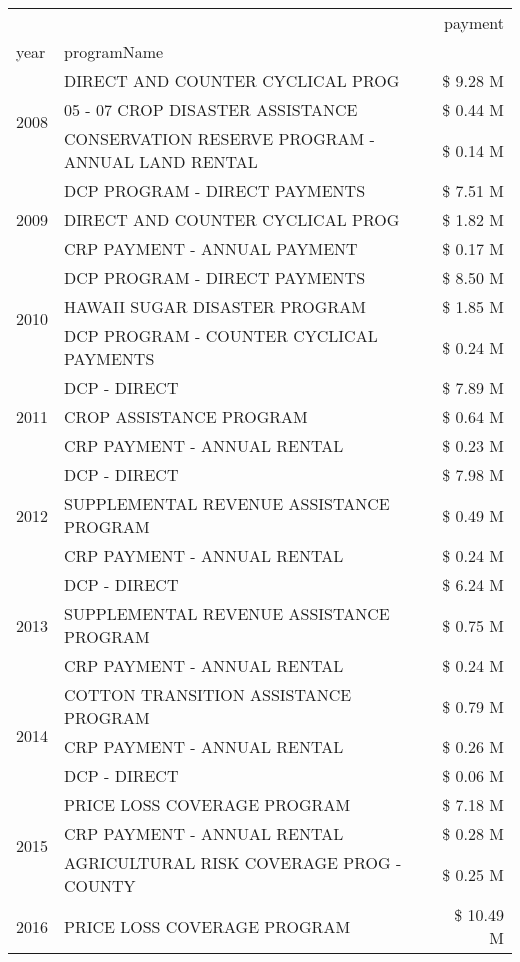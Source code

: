 \begin{tabular}{llr}
\toprule
 &  & payment \\
year & programName &  \\
\midrule
\multirow[t]{3}{*}{2008} & DIRECT AND COUNTER CYCLICAL PROG & \$ 9.28 M \\
 & 05 - 07 CROP DISASTER ASSISTANCE & \$ 0.44 M \\
 & CONSERVATION RESERVE PROGRAM - ANNUAL LAND RENTAL & \$ 0.14 M \\
\cline{1-3}
\multirow[t]{3}{*}{2009} & DCP PROGRAM - DIRECT PAYMENTS & \$ 7.51 M \\
 & DIRECT AND COUNTER CYCLICAL PROG & \$ 1.82 M \\
 & CRP PAYMENT - ANNUAL PAYMENT & \$ 0.17 M \\
\cline{1-3}
\multirow[t]{3}{*}{2010} & DCP PROGRAM - DIRECT PAYMENTS & \$ 8.50 M \\
 & HAWAII SUGAR DISASTER PROGRAM & \$ 1.85 M \\
 & DCP PROGRAM - COUNTER CYCLICAL PAYMENTS & \$ 0.24 M \\
\cline{1-3}
\multirow[t]{3}{*}{2011} & DCP - DIRECT & \$ 7.89 M \\
 & CROP ASSISTANCE PROGRAM & \$ 0.64 M \\
 & CRP PAYMENT - ANNUAL RENTAL & \$ 0.23 M \\
\cline{1-3}
\multirow[t]{3}{*}{2012} & DCP - DIRECT & \$ 7.98 M \\
 & SUPPLEMENTAL REVENUE ASSISTANCE PROGRAM & \$ 0.49 M \\
 & CRP PAYMENT - ANNUAL RENTAL & \$ 0.24 M \\
\cline{1-3}
\multirow[t]{3}{*}{2013} & DCP - DIRECT & \$ 6.24 M \\
 & SUPPLEMENTAL REVENUE ASSISTANCE PROGRAM & \$ 0.75 M \\
 & CRP PAYMENT - ANNUAL RENTAL & \$ 0.24 M \\
\cline{1-3}
\multirow[t]{3}{*}{2014} & COTTON TRANSITION ASSISTANCE PROGRAM & \$ 0.79 M \\
 & CRP PAYMENT - ANNUAL RENTAL & \$ 0.26 M \\
 & DCP - DIRECT & \$ 0.06 M \\
\cline{1-3}
\multirow[t]{3}{*}{2015} & PRICE LOSS COVERAGE PROGRAM & \$ 7.18 M \\
 & CRP PAYMENT - ANNUAL RENTAL & \$ 0.28 M \\
 & AGRICULTURAL RISK COVERAGE PROG - COUNTY & \$ 0.25 M \\
\cline{1-3}
\multirow[t]{3}{*}{2016} & PRICE LOSS COVERAGE PROGRAM                   & \$ 10.49 M \\

\end{tabular}
